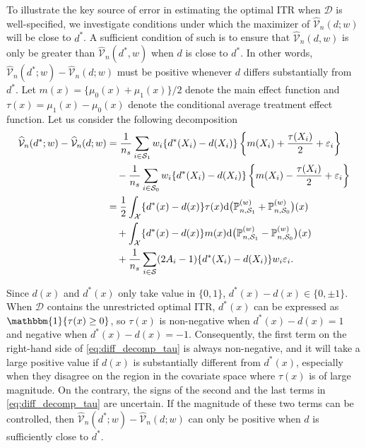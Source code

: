 \documentclass[12pt]{article}
\newcommand{\prob}{\mathbb{P}}
\newcommand{\ind}{\mathbbm{1}}
\begin{document}
To illustrate the key source of error in estimating the optimal ITR when $\mathcal{D}$ is well-specified, we investigate conditions under which the maximizer of $\widehat{\mathcal{V}}_n(d; w)$ will be close to $d^*$. A sufficient condition of such is to ensure that $\widehat{\mathcal{V}}_n(d, w)$ is only be greater than $\widehat{\mathcal{V}}_n(d^*, w)$ when $d$ is close to $d^*$. In other words, $\widehat{\mathcal{V}}_n(d^*; w) - \widehat{\mathcal{V}}_n(d; w)$ must be positive whenever $d$ differs substantially from $d^*$.
Let $m(x) = \{\mu_0(x) + \mu_1(x)\}/ 2$ denote the main effect function and $\tau(x) = \mu_1(x) - \mu_0(x)$ denote the conditional average treatment effect function. Let us consider the following decomposition
\begin{equation}
    \label{eq:diff_decomp_tau}
    \begin{aligned}
        \widehat{\mathcal{V}}_n(d^*; w) - \widehat{\mathcal{V}}_n(d; w)
        &= 
        \frac{1}{n_s} \sum_{i\in \mathcal{S}_1}  w_i \{d^*(X_i) - d(X_i)\} \left\{m(X_i) + \frac{\tau(X_i)}{2} + \varepsilon_i\right\} 
        \\&\quad -
        \frac{1}{n_s} \sum_{i\in \mathcal{S}_0}  w_i \{d^*(X_i) - d(X_i)\} \left\{m(X_i) - \frac{\tau(X_i)}{2} + \varepsilon_i\right\}
        \\&=
        \frac{1}{2} \int_\mathcal{X} \{d^*(x) - d(x)\} \tau(x) \textnormal{d} \big( \prob_{n,\mathcal{S}_1}^{(w)} + \prob_{n,\mathcal{S}_0}^{(w)}\big)(x)
        \\&\quad+
        \int_\mathcal{X} \{d^*(x) - d(x)\} m(x) \textnormal{d} \big( \prob_{n,\mathcal{S}_1}^{(w)} - \prob_{n,\mathcal{S}_0}^{(w)}\big) (x) 
        \\&\quad+
        \frac{1}{n_s} \sum_{i \in \mathcal{S}} (2A_i - 1) \{d^*(X_i) - d(X_i)\} w_i \varepsilon_i
    .\end{aligned}
\end{equation}

Since $d(x)$ and $d^*(x)$ only take value in $\{0, 1\}$, $d^*(x) - d(x) \in \{0, \pm1\}$. When $\mathcal{D}$ contains the unrestricted optimal ITR, $d^*(x)$ can be expressed as $\ind \{ \tau(x) \ge 0 \}$, so $\tau(x)$ is non-negative when $d^*(x) - d(x) = 1$ and negative when $d^*(x) - d(x) = -1$. Consequently,  the first term on the right-hand side of \eqref{eq:diff_decomp_tau} is always non-negative, and it will take a large positive value if $d(x)$ is substantially different from $d^*(x)$, especially when they disagree on the region in the covariate space where $\tau(x)$ is of large magnitude. On the contrary, the signs of the second and the last terms in \eqref{eq:diff_decomp_tau} are uncertain. If the magnitude of these two terms can be controlled, then $\widehat{\mathcal{V}}_n(d^*; w) - \widehat{\mathcal{V}}_n(d; w)$ can only be positive when $d$ is sufficiently close to $d^*$.
\end{document}
